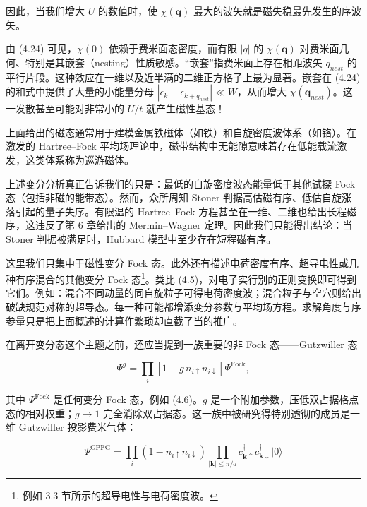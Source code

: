 因此，当我们增大 $U$ 的数值时，使 $\chi(\mathbf{q})$ 最大的波矢就是磁失稳最先发生的序波矢。

由 (4.24) 可见，$\chi(0)$ 依赖于费米面态密度，而有限 $|q|$ 的 $\chi(\mathbf{q})$ 对费米面几何、特别是其嵌套（nesting）性质敏感。“嵌套”指费米面上存在相距波矢 $q_{nest}$ 的平行片段。这种效应在一维以及近半满的二维正方格子上最为显著。嵌套在 (4.24) 的和式中提供了大量的小能量分母 $|\epsilon_{k}-\epsilon_{k+q_{nest}}| \ll W$，从而增大 $\chi(\mathbf{q}_{nest})$。这一发散甚至可能对非常小的 $U/t$ 就产生磁性基态！

上面给出的磁态通常用于建模金属铁磁体（如铁）和自旋密度波体系（如铬）。在激发的 Hartree--Fock 平均场理论中，磁带结构中无能隙意味着存在低能载流激发，这类体系称为巡游磁体。

上述变分分析真正告诉我们的只是：最低的自旋密度波态能量低于其他试探 Fock 态（包括非磁的能带态）。然而，众所周知 Stoner 判据高估磁有序、低估自旋涨落引起的量子失序。有限温的 Hartree--Fock 方程甚至在一维、二维也给出长程磁序，这违反了第 6 章给出的 Mermin--Wagner 定理。因此我们只能得出结论：当 Stoner 判据被满足时，Hubbard 模型中至少存在短程磁有序。

这里我们只集中于磁性变分 Fock 态。此外还有描述电荷密度有序、超导电性或几种有序混合的其他变分 Fock 态\footnote{例如 3.3 节所示的超导电性与电荷密度波。}。类比 (4.5)，对电子实行别的正则变换即可得到它们。例如：混合不同动量的同自旋粒子可得电荷密度波；混合粒子与空穴则给出破缺规范对称的超导态。每一种可能都增添变分参数与平均场方程。求解角度与序参量只是把上面概述的计算作繁琐却直截了当的推广。

在离开变分态这个主题之前，还应当提到一族重要的非 Fock 态——Gutzwiller 态

\begin{equation*}
\Psi^ {g} = \prod_ {i} \left[ 1 - g \, n _ {i \uparrow} n _ {i \downarrow} \right] \Psi^ {\mathrm{Fock}},
\tag{4.26}
\end{equation*}

其中 $\Psi^{\mathrm{Fock}}$ 是任何变分 Fock 态，例如 (4.6)。$g$ 是一个附加参数，压低双占据格点态的相对权重；$g \rightarrow 1$ 完全消除双占据态。这一族中被研究得特别透彻的成员是一维 Gutzwiller 投影费米气体：

\begin{equation*}
\Psi^ {\mathrm{GPFG}} = \prod_ {i} \left( 1 - n _ {i \uparrow} n _ {i \downarrow} \right) \prod_ {| \mathbf {k} | \leq \pi / a} c _ {\mathbf {k} \uparrow} ^ {\dagger} c _ {\mathbf {k} \downarrow} ^ {\dagger} | 0 \rangle
\tag{4.27}
\end{equation*}


